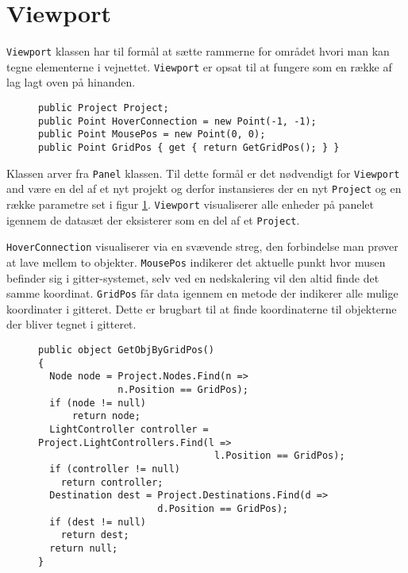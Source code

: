 \section{Viewport}\label{Viewport}
\texttt{Viewport} klassen har til formål at sætte rammerne for området hvori man kan tegne elementerne i vejnettet. \texttt{Viewport} er opsat til at fungere som en række af lag lagt oven på hinanden. 

\begin{figure}[H]
\begin{lstlisting}
public Project Project;
public Point HoverConnection = new Point(-1, -1);
public Point MousePos = new Point(0, 0);
public Point GridPos { get { return GetGridPos(); } }
\end{lstlisting}
\caption{}
\label{ViewportParameters}
\end{figure}

Klassen arver fra \texttt{Panel} klassen. Til dette formål er det nødvendigt for \texttt{Viewport} and være en del af et nyt projekt og derfor instansieres der en nyt \texttt{Project} og en række parametre set i figur \ref{ViewportParameters}. \texttt{Viewport} visualiserer alle enheder på panelet igennem de datasæt der eksisterer som en del af et \texttt{Project}.

\vspace{5mm}

\texttt{HoverConnection} visualiserer via en svævende streg, den forbindelse man prøver at lave mellem to objekter. \texttt{MousePos} indikerer det aktuelle punkt hvor musen befinder sig i gitter-systemet, selv ved en nedskalering vil den altid finde det samme koordinat. \texttt{GridPos} får data igennem en metode der indikerer alle mulige koordinater i gitteret. Dette er brugbart til at finde koordinaterne til objekterne der bliver tegnet i gitteret.

\begin{figure}[H]
\begin{lstlisting}
public object GetObjByGridPos()
{
  Node node = Project.Nodes.Find(n => 
              n.Position == GridPos);
  if (node != null)
      return node;
  LightController controller = Project.LightControllers.Find(l => 
                               l.Position == GridPos);
  if (controller != null)
    return controller;
  Destination dest = Project.Destinations.Find(d => 
                     d.Position == GridPos);
  if (dest != null)
    return dest;
  return null;
}
\end{lstlisting}
\caption{}
\label{ViewportGetObjByGridPos}
\end{figure}

